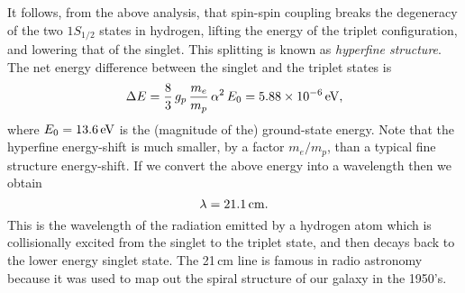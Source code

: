 It follows, from the above analysis, that spin-spin coupling breaks
the degeneracy of the two $1S_{1/2}$ states in hydrogen, lifting the
energy of the triplet configuration, and lowering that of the singlet.
This splitting is known as {\em hyperfine structure}.
The net energy difference between the singlet and the triplet states
is
\begin{equation}
\Delta E = \frac{8}{3}\,g_p\,\frac{m_e}{m_p}\,\alpha^2\,E_0 = 5.88\times 10^{-6}\,{\rm eV},
\end{equation}
where $E_0=13.6\,{\rm eV}$ is the (magnitude of the) ground-state energy.
Note that the hyperfine energy-shift is much smaller, by a factor $m_e/m_p$, than
a typical fine structure energy-shift.
If we convert the above energy into a wavelength then we obtain
\begin{equation}
\lambda = 21.1\,{\rm cm}.
\end{equation}
This is the wavelength of the radiation emitted by a hydrogen atom
which is collisionally excited from the singlet to the triplet
state, and then decays back to the lower energy singlet state. 
The 21\,cm line is famous in  radio astronomy because it was used to
map out the spiral structure of our galaxy in the 1950's. 